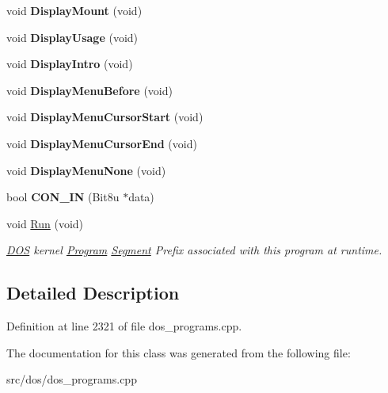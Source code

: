 \begin{DoxyCompactItemize}
\item 
\hypertarget{classINTRO_a5c6e294e686b9c667e58bd2ca8e13bb4}{void {\bfseries Display\-Mount} (void)}\label{classINTRO_a5c6e294e686b9c667e58bd2ca8e13bb4}

\item 
\hypertarget{classINTRO_a4857619c9d351417a9a8c87b29bed52c}{void {\bfseries Display\-Usage} (void)}\label{classINTRO_a4857619c9d351417a9a8c87b29bed52c}

\item 
\hypertarget{classINTRO_a3e68c8cde2fce914c656154f273f7149}{void {\bfseries Display\-Intro} (void)}\label{classINTRO_a3e68c8cde2fce914c656154f273f7149}

\item 
\hypertarget{classINTRO_a0c242eac779e67c6168613e6b2a81290}{void {\bfseries Display\-Menu\-Before} (void)}\label{classINTRO_a0c242eac779e67c6168613e6b2a81290}

\item 
\hypertarget{classINTRO_a53f19e5f292278bcd847a8a44b0bdc5d}{void {\bfseries Display\-Menu\-Cursor\-Start} (void)}\label{classINTRO_a53f19e5f292278bcd847a8a44b0bdc5d}

\item 
\hypertarget{classINTRO_a3ed7b89911f2fbd3f0b5a8412d9d91c5}{void {\bfseries Display\-Menu\-Cursor\-End} (void)}\label{classINTRO_a3ed7b89911f2fbd3f0b5a8412d9d91c5}

\item 
\hypertarget{classINTRO_a83e703c1fe7702783fbd1ce1320235a6}{void {\bfseries Display\-Menu\-None} (void)}\label{classINTRO_a83e703c1fe7702783fbd1ce1320235a6}

\item 
\hypertarget{classINTRO_ab717779f33410fb437dfb3b82fcf8e65}{bool {\bfseries C\-O\-N\-\_\-\-I\-N} (Bit8u $\ast$data)}\label{classINTRO_ab717779f33410fb437dfb3b82fcf8e65}

\item 
\hypertarget{classINTRO_a7fe083b2cab4fe79e280b030cc542fd3}{void \hyperlink{classINTRO_a7fe083b2cab4fe79e280b030cc542fd3}{Run} (void)}\label{classINTRO_a7fe083b2cab4fe79e280b030cc542fd3}

\begin{DoxyCompactList}\small\item\em \hyperlink{classDOS}{D\-O\-S} kernel \hyperlink{classProgram}{Program} \hyperlink{structSegment}{Segment} Prefix associated with this program at runtime. \end{DoxyCompactList}\end{DoxyCompactItemize}


\subsection{Detailed Description}


Definition at line 2321 of file dos\-\_\-programs.\-cpp.



The documentation for this class was generated from the following file\-:\begin{DoxyCompactItemize}
\item 
src/dos/dos\-\_\-programs.\-cpp\end{DoxyCompactItemize}

